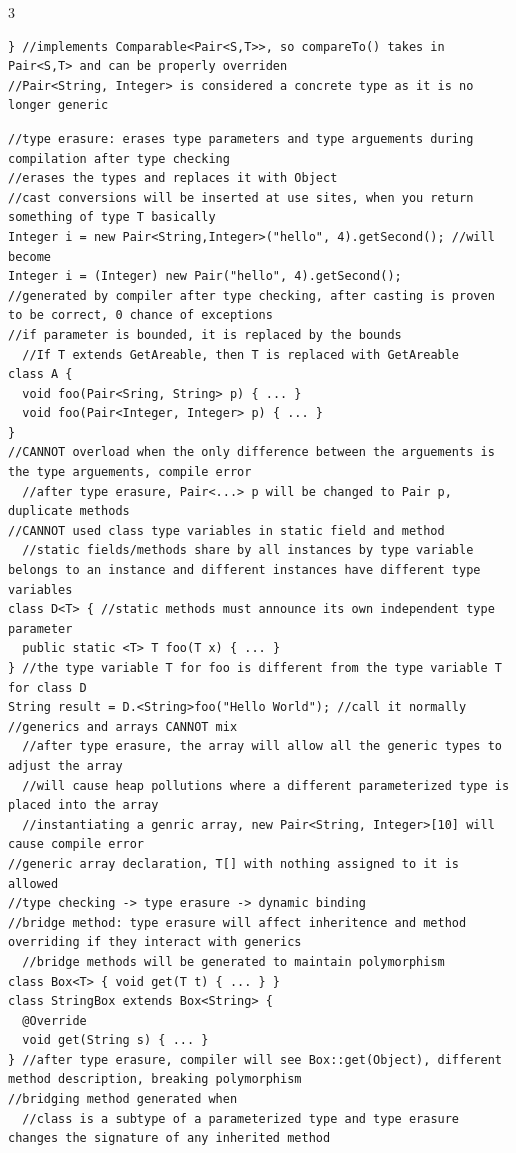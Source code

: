 \documentclass[10pt,a4paper]{article}
\begin{document}
\begin{multicols*}{3}
\begin{verbatim}
} //implements Comparable<Pair<S,T>>, so compareTo() takes in Pair<S,T> and can be properly overriden
//Pair<String, Integer> is considered a concrete type as it is no longer generic
\end{verbatim}
\begin{verbatim}
//type erasure: erases type parameters and type arguements during compilation after type checking
//erases the types and replaces it with Object
//cast conversions will be inserted at use sites, when you return something of type T basically
Integer i = new Pair<String,Integer>("hello", 4).getSecond(); //will become
Integer i = (Integer) new Pair("hello", 4).getSecond();
//generated by compiler after type checking, after casting is proven to be correct, 0 chance of exceptions
//if parameter is bounded, it is replaced by the bounds
  //If T extends GetAreable, then T is replaced with GetAreable
class A {
  void foo(Pair<Sring, String> p) { ... }
  void foo(Pair<Integer, Integer> p) { ... }
}
//CANNOT overload when the only difference between the arguements is the type arguements, compile error
  //after type erasure, Pair<...> p will be changed to Pair p, duplicate methods
//CANNOT used class type variables in static field and method
  //static fields/methods share by all instances by type variable belongs to an instance and different instances have different type variables
class D<T> { //static methods must announce its own independent type parameter
  public static <T> T foo(T x) { ... }
} //the type variable T for foo is different from the type variable T for class D
String result = D.<String>foo("Hello World"); //call it normally
//generics and arrays CANNOT mix
  //after type erasure, the array will allow all the generic types to adjust the array
  //will cause heap pollutions where a different parameterized type is placed into the array
  //instantiating a genric array, new Pair<String, Integer>[10] will cause compile error
//generic array declaration, T[] with nothing assigned to it is allowed
//type checking -> type erasure -> dynamic binding
//bridge method: type erasure will affect inheritence and method overriding if they interact with generics
  //bridge methods will be generated to maintain polymorphism
class Box<T> { void get(T t) { ... } }
class StringBox extends Box<String> {
  @Override
  void get(String s) { ... }
} //after type erasure, compiler will see Box::get(Object), different method description, breaking polymorphism
//bridging method generated when
  //class is a subtype of a parameterized type and type erasure changes the signature of any inherited method

\end{verbatim}
\end{multicols*}
\end{document}
